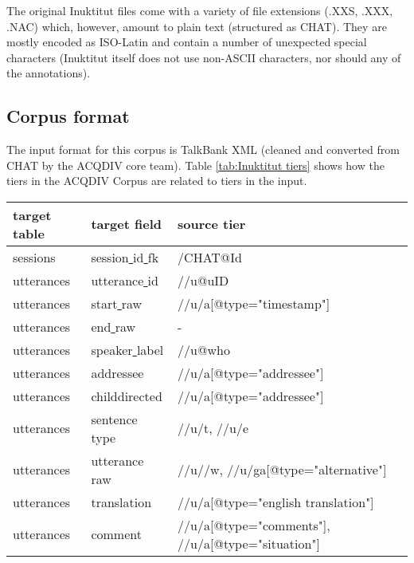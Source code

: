 \documentclass[a4paper, 11pt]{book}
\newcommand{\und}{\underline{{ }}\hspace{0.2mm}}	%
\begin{document}
The original Inuktitut files come with a variety of file extensions (.XXS, .XXX, .NAC) which, however, amount to plain text (structured as CHAT). They are mostly encoded as ISO-Latin and contain a number of unexpected special characters (Inuktitut itself does not use non-ASCII characters, nor should any of the annotations). 

\subsection{Corpus format}

The input format for this corpus is TalkBank XML (cleaned and converted from CHAT by the ACQDIV core team). Table \autoref{tab:Inuktitut tiers} shows how the tiers in the ACQDIV Corpus are related to tiers in the input. 

\begin{table}[ht!]
	\centering
	\begin{tabular}{lll}
		\toprule
			\textbf{target table} & \textbf{target field} & \textbf{source tier} \\
		\midrule
			sessions 	& session\und id\und fk 	& /CHAT@Id \\
			utterances 	& utterance\und id	& //u@uID \\
			utterances 	& start\und raw		& //u/a[@type="timestamp"] \\
			utterances 	& end\und raw		& - \\
			utterances 	& speaker\und label	& //u@who \\
			utterances 	& addressee			& //u/a[@type="addressee"] \\
			utterances 	& childdirected		& //u/a[@type="addressee"] \\
			utterances 	& sentence\und type	& //u/t, //u/e \\
			utterances 	& utterance\und raw	& //u//w, //u/ga[@type="alternative"] \\
			utterances 	& translation		& //u/a[@type="english translation"] \\
			utterances 	& comment			& //u/a[@type="comments"], //u/a[@type="situation"] \\


\end{tabular}
\end{table}
\end{document}
